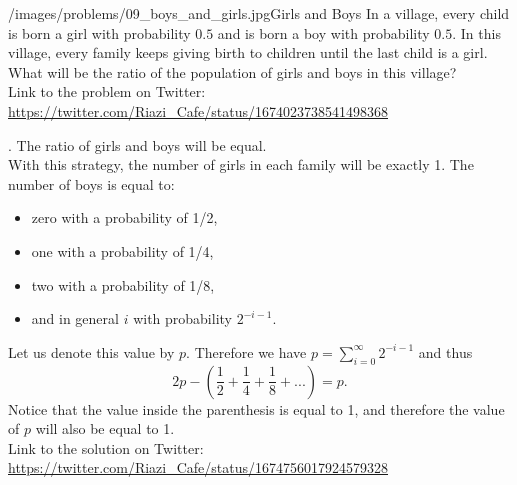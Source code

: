\begin{problem}{/images/problems/09_boys_and_girls.jpg}{Girls and Boys} In a village, every child is born a girl with probability $0.5$ and is born a boy with probability $0.5$. In this village, every family keeps giving birth to children until the last child is a girl. What will be the ratio of the population of girls and boys in this village?\\[0.2cm]

Link to the problem on Twitter:  \url{https://twitter.com/Riazi_Cafe/status/1674023738541498368}\end{problem}
\begin{solution}.
The ratio of girls and boys will be equal.\\[0.2cm]

With this strategy, the number of girls in each family will be exactly 1. The number of boys is equal to:

\begin{itemize}
\item zero with a probability of 1/2,
\item one with a probability of 1/4,
\item two with a probability of 1/8,
\item and in general $i$ with probability $2^{-i-1}$.
\end{itemize}

Let us denote this value by $p$. Therefore we have $p = \sum_{i=0}^{\infty} 2^{-i-1}$ and thus  $$2p - (\frac{1}{2} + \frac{1}{4} + \frac{1}{8} + ...) = p.$$
Notice that the value inside the parenthesis is equal to 1, and therefore the value of $p$ will also be equal to 1.\\[0.2cm]


Link to the solution on Twitter:  \url{https://twitter.com/Riazi_Cafe/status/1674756017924579328}\end{solution}
